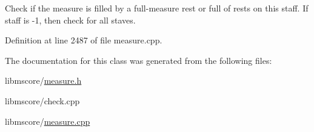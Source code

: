Check if the measure is filled by a full-\/measure rest or full of rests on this staff. If staff is -\/1, then check for all staves. 

Definition at line 2487 of file measure.\+cpp.



The documentation for this class was generated from the following files\+:\begin{DoxyCompactItemize}
\item 
libmscore/\hyperlink{measure_8h}{measure.\+h}\item 
libmscore/check.\+cpp\item 
libmscore/\hyperlink{measure_8cpp}{measure.\+cpp}\end{DoxyCompactItemize}
